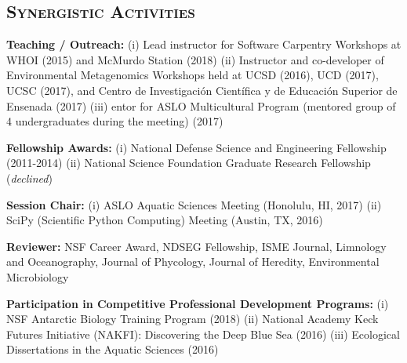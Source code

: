 \documentclass[svgnames,11pt]{article}
\begin{document}
 \nocite{Alexander2018, Johnson2018, Hu2018, Haley2017, Harke2017, Moniruzzaman2017, Alexander2015a, Alexander2015, Alexander2012, Dyhrman2012}



\subsection*{\textsc{Synergistic Activities}}

\begin{bibenum}[itemsep=4pt]

    \item \textbf{Teaching / Outreach:} (i) Lead instructor for Software Carpentry Workshops at WHOI (2015) and McMurdo Station (2018) (ii) Instructor and co-developer of Environmental Metagenomics Workshops held at UCSD (2016), UCD (2017), UCSC (2017), and Centro de Investigaci\'{o}n Cient\'{i}fica y de Educaci\'{o}n Superior de Ensenada (2017) (iii) entor for ASLO Multicultural Program (mentored group of 4 undergraduates during the meeting) (2017)

    \item \textbf{Fellowship Awards:} (i) National Defense Science and Engineering Fellowship (2011-2014) (ii) National Science Foundation Graduate Research Fellowship (\textit{declined})

    \item \textbf{Session Chair:} (i) ASLO Aquatic Sciences Meeting (Honolulu, HI, 2017) (ii) SciPy (Scientific Python Computing) Meeting (Austin, TX, 2016)

    \item \textbf{Reviewer:} NSF Career Award, NDSEG Fellowship, ISME Journal, Limnology and Oceanography, Journal of Phycology, Journal of Heredity, Environmental Microbiology

    \item \textbf{Participation in Competitive Professional Development Programs:}
    (i) NSF Antarctic Biology Training Program (2018) (ii) National Academy Keck Futures Initiative (NAKFI): Discovering the Deep Blue Sea (2016) (iii)  Ecological Dissertations in the Aquatic Sciences (2016)

\end{bibenum}
\end{document}
